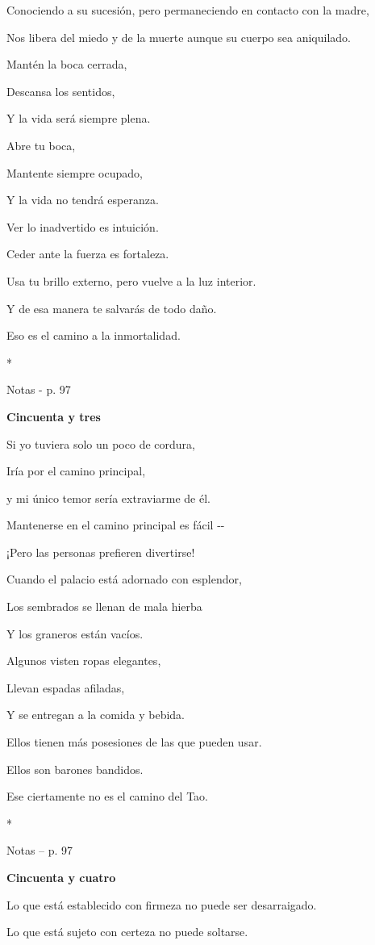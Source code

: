 Conociendo a su sucesión, pero permaneciendo en contacto con la madre,

Nos libera del miedo y de la muerte aunque su cuerpo sea aniquilado.

Mantén la boca cerrada,

Descansa los sentidos,

Y la vida será siempre plena.

Abre tu boca,

Mantente siempre ocupado,

Y la vida no tendrá esperanza.

Ver lo inadvertido es intuición.

Ceder ante la fuerza es fortaleza.

Usa tu brillo externo, pero vuelve a la luz interior.

Y de esa manera te salvarás de todo daño.

Eso es el camino a la inmortalidad.

*

Notas - p. 97

\textbf{Cincuenta y tres}

Si yo tuviera solo un poco de cordura,

Iría por el camino principal,

y mi único temor sería extraviarme de él.

Mantenerse en el camino principal es fácil -\/-

¡Pero las personas prefieren divertirse!

Cuando el palacio está adornado con esplendor,

Los sembrados se llenan de mala hierba

Y los graneros están vacíos.

Algunos visten ropas elegantes,

Llevan espadas afiladas,

Y se entregan a la comida y bebida.

Ellos tienen más posesiones de las que pueden usar.

Ellos son barones bandidos.

Ese ciertamente no es el camino del Tao.

*

Notas -- p. 97

\textbf{Cincuenta y cuatro}

Lo que está establecido con firmeza no puede ser desarraigado.

Lo que está sujeto con certeza no puede soltarse.


